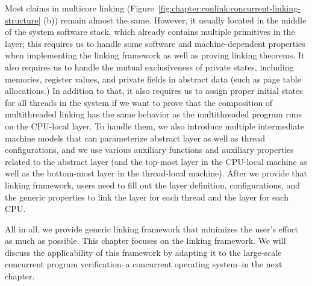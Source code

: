 Most claims in multicore linking (Figure~\ref{fig:chapter:conlink:concurrent-linking-structure} (b)) remain almost the same. 
However, it usually located in the middle of the system software stack, which already contains multiple primitives in the layer; this requires us to handle
 some  software and machine-dependent properties when implementing the linking framework as well as proving linking theorems. 
It also requires us to handle the mutual exclusiveness of 
private states, including memories, register values, and private fields in abstract data (such as page table allocations.)
In addition to that, it also requires us to assign proper initial states for all threads in the system if we want to prove that the composition of multithreaded linking has the same behavior as the multithreaded program runs on the CPU-local layer. 
To handle them, we also introduce multiple intermediate machine models that can parameterize abstract layer as well as thread configurations, and we use various auxiliary functions and auxiliary properties related to the abstract layer (and the top-most layer in the CPU-local machine as well as the bottom-most layer in the thread-local machine). 
After we provide that linking framework, users need to 
fill out the layer definition, configurations, and the generic properties to link the layer for each thread and the layer for each CPU.

All in all, we provide  generic linking framework that minimizes the user's effort as much as possible.
This chapter focuses on  the linking framework.
We will discuss the applicability of this framework by adapting it to the large-scale concurrent program verification--a concurrent operating system--in the next chapter.








